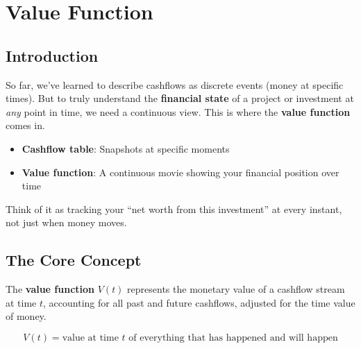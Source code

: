 \documentclass[
  letterpaper,
]{scrbook}
\providecommand{\tightlist}{%
  \setlength{\itemsep}{0pt}\setlength{\parskip}{0pt}}
\begin{document}
\chapter{Value Function}\label{value-function}

\section{Introduction}\label{introduction-2}

So far, we've learned to describe cashflows as discrete events (money at
specific times). But to truly understand the \textbf{financial state} of
a project or investment at \emph{any} point in time, we need a
continuous view. This is where the \textbf{value function} comes in.

\begin{tcolorbox}[enhanced jigsaw, toptitle=1mm, colbacktitle=quarto-callout-tip-color!10!white, opacityback=0, leftrule=.75mm, breakable, colframe=quarto-callout-tip-color-frame, toprule=.15mm, opacitybacktitle=0.6, coltitle=black, bottomrule=.15mm, colback=white, arc=.35mm, titlerule=0mm, rightrule=.15mm, left=2mm, title=\textcolor{quarto-callout-tip-color}{\faLightbulb}\hspace{0.5em}{Intuition: From Snapshots to a Movie}, bottomtitle=1mm]

\begin{itemize}
\tightlist
\item
  \textbf{Cashflow table}: Snapshots at specific moments
\item
  \textbf{Value function}: A continuous movie showing your financial
  position over time
\end{itemize}

Think of it as tracking your ``net worth from this investment'' at every
instant, not just when money moves.

\end{tcolorbox}

\section{The Core Concept}\label{the-core-concept}

\begin{tcolorbox}[enhanced jigsaw, toptitle=1mm, colbacktitle=quarto-callout-note-color!10!white, opacityback=0, leftrule=.75mm, breakable, colframe=quarto-callout-note-color-frame, toprule=.15mm, opacitybacktitle=0.6, coltitle=black, bottomrule=.15mm, colback=white, arc=.35mm, titlerule=0mm, rightrule=.15mm, left=2mm, title=\textcolor{quarto-callout-note-color}{\faInfo}\hspace{0.5em}{Definition: Value Function}, bottomtitle=1mm]

The \textbf{value function} \(V(t)\) represents the monetary value of a
cashflow stream at time \(t\), accounting for all past and future
cashflows, adjusted for the time value of money.

\[
V(t) = \text{value at time } t \text{ of everything that has happened and will happen}
\]

\end{tcolorbox}
\end{document}
